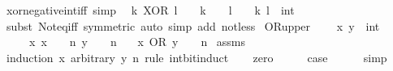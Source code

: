 \begin{isabellebody}
\endisatagproof
{\isafoldproof}%
%
\isadelimproof
\isanewline
%
\endisadelimproof
\isanewline
{}\isamarkupfalse%
\ xor{\isacharunderscore}{\kern0pt}negative{\isacharunderscore}{\kern0pt}int{\isacharunderscore}{\kern0pt}iff\ {\isacharbrackleft}{\kern0pt}simp{\isacharbrackright}{\kern0pt}{\isacharcolon}{\kern0pt}\isanewline
\ \ {\isacartoucheopen}k\ XOR\ l\ {\isacharless}{\kern0pt}\ {}\ {\isasymlongleftrightarrow}\ {\isacharparenleft}{\kern0pt}k\ {\isacharless}{\kern0pt}\ {}{\isacharparenright}{\kern0pt}\ {\isasymnoteq}\ {\isacharparenleft}{\kern0pt}l\ {\isacharless}{\kern0pt}\ {}{\isacharparenright}{\kern0pt}{\isacartoucheclose}\ \ k\ l\ {\isacharcolon}{\kern0pt}{\isacharcolon}{\kern0pt}\ int\isanewline
%
\isadelimproof
\ \ %
\endisadelimproof
%
\isatagproof
{}\isamarkupfalse%
\ {\isacharparenleft}{\kern0pt}subst\ Not{\isacharunderscore}{\kern0pt}eq{\isacharunderscore}{\kern0pt}iff\ {\isacharbrackleft}{\kern0pt}symmetric{\isacharbrackright}{\kern0pt}{\isacharparenright}{\kern0pt}\ {\isacharparenleft}{\kern0pt}auto\ simp\ add{\isacharcolon}{\kern0pt}\ not{\isacharunderscore}{\kern0pt}less{\isacharparenright}{\kern0pt}%
\endisatagproof
{\isafoldproof}%
%
\isadelimproof
\isanewline
%
\endisadelimproof
\isanewline
{}\isamarkupfalse%
\ OR{\isacharunderscore}{\kern0pt}upper{\isacharcolon}{\kern0pt}\ \isanewline
\ \ \ x\ y\ {\isacharcolon}{\kern0pt}{\isacharcolon}{\kern0pt}\ int\isanewline
\ \ \ {\isacartoucheopen}{}\ {\isasymle}\ x{\isacartoucheclose}\ {\isacartoucheopen}x\ {\isacharless}{\kern0pt}\ {}\ {\isacharcircum}{\kern0pt}\ n{\isacartoucheclose}\ {\isacartoucheopen}y\ {\isacharless}{\kern0pt}\ {}\ {\isacharcircum}{\kern0pt}\ n{\isacartoucheclose}\isanewline
\ \ \ {\isacartoucheopen}x\ OR\ y\ {\isacharless}{\kern0pt}\ {}\ {\isacharcircum}{\kern0pt}\ n{\isacartoucheclose}\isanewline
%
\isadelimproof
%
\endisadelimproof
%
\isatagproof
{}\isamarkupfalse%
\ assms\ \isamarkupfalse%
\ {\isacharparenleft}{\kern0pt}induction\ x\ arbitrary{\isacharcolon}{\kern0pt}\ y\ n\ rule{\isacharcolon}{\kern0pt}\ int{\isacharunderscore}{\kern0pt}bit{\isacharunderscore}{\kern0pt}induct{\isacharparenright}{\kern0pt}\isanewline
\ \ \isamarkupfalse%
\ zero\isanewline
\ \ \isamarkupfalse%
\ \isamarkupfalse%
\ {\isacharquery}{\kern0pt}case\isanewline
\ \ \ \ \isamarkupfalse%
\ simp\isanewline

\end{isabellebody}
